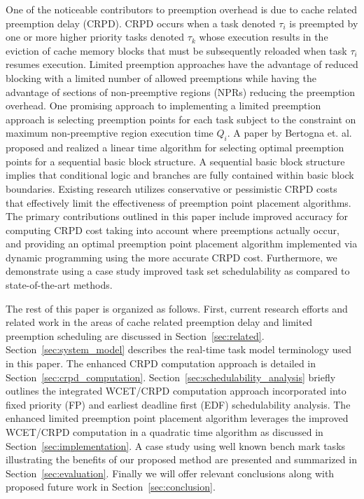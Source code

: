 One of the noticeable contributors to preemption overhead is due to cache related preemption delay (CRPD).  CRPD occurs when a task denoted \begin{math}\tau_{i}\end{math} is preempted by one or more higher priority tasks denoted \begin{math}\tau_{k}\end{math} whose execution results in the eviction of cache memory blocks that must be subsequently reloaded when task \begin{math}\tau_{i}\end{math} resumes execution.  Limited preemption approaches have the advantage of reduced blocking with a limited number of allowed preemptions while having the advantage of sections of non-preemptive regions (NPRs) reducing the preemption overhead.  One promising approach to implementing a limited preemption approach is selecting preemption points for each task subject to the constraint on maximum non-preemptive region execution time \begin{math}Q_{i}\end{math}.  A paper by Bertogna et. al.~\cite{bertogna:11} proposed and realized a linear time algorithm for selecting optimal preemption points for a sequential basic block structure.  A sequential basic block structure implies that conditional logic and branches are fully contained within basic block boundaries.
Existing research utilizes conservative or pessimistic CRPD costs that effectively limit the effectiveness of preemption point placement algorithms.
The primary contributions outlined in this paper include improved accuracy for computing CRPD cost taking into account where preemptions actually occur, and providing an optimal preemption point placement algorithm implemented via dynamic programming using the more accurate CRPD cost.  Furthermore, we demonstrate using a case study improved task set schedulability as compared to state-of-the-art methods.

The rest of this paper is organized as follows. First, current research efforts and related work in the areas of cache related preemption delay and limited preemption scheduling are discussed in Section~\ref{sec:related}.  Section~\ref{sec:system_model} describes the real-time task model terminology used in this paper.  The enhanced CRPD computation approach is detailed in Section~\ref{sec:crpd_computation}. Section~\ref{sec:schedulability_analysis} briefly outlines the integrated WCET/CRPD computation approach incorporated into fixed priority (FP) and earliest deadline first (EDF) schedulability analysis.  The enhanced limited preemption point placement algorithm leverages the improved WCET/CRPD computation in a quadratic time algorithm as discussed in Section~\ref{sec:implementation}.  A case study using well known bench mark tasks illustrating the benefits of our proposed method are presented and summarized in Section~\ref{sec:evaluation}.  Finally we will offer relevant conclusions along with proposed future work in Section~\ref{sec:conclusion}. 